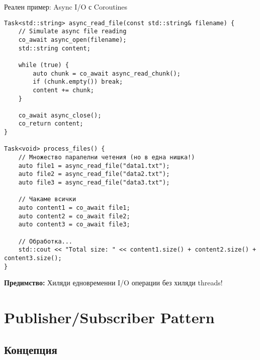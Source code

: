 \documentclass[aspectratio=169]{beamer}
\begin{document}
\begin{frame}[fragile]{Реален пример: Async I/O с Coroutines}
\begin{lstlisting}[basicstyle=\ttfamily\tiny]
Task<std::string> async_read_file(const std::string& filename) {
    // Simulate async file reading
    co_await async_open(filename);
    std::string content;
    
    while (true) {
        auto chunk = co_await async_read_chunk();
        if (chunk.empty()) break;
        content += chunk;
    }
    
    co_await async_close();
    co_return content;
}

Task<void> process_files() {
    // Множество паралелни четения (но в една нишка!)
    auto file1 = async_read_file("data1.txt");
    auto file2 = async_read_file("data2.txt");
    auto file3 = async_read_file("data3.txt");
    
    // Чакаме всички
    auto content1 = co_await file1;
    auto content2 = co_await file2;
    auto content3 = co_await file3;
    
    // Обработка...
    std::cout << "Total size: " << content1.size() + content2.size() + content3.size();
}
\end{lstlisting}

\textbf{Предимство:} Хиляди едновременни I/O операции без хиляди threads!
\end{frame}

\section{Publisher/Subscriber Pattern}

\subsection{Концепция}
\end{document}
